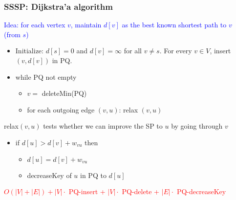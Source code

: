   \begin{frame}[fragile]
  \frametitle{SSSP: Dijkstra'a algorithm}

\textcolor{blue}{Idea: for each vertex $v$, maintain $d[v]$ as the best known shortest path to $v$ (from $s$)}

 
\begin{itemize} 
\item  Initialize: $d[s]=0$ and  $d[v] = \infty$ for all $v \neq s$. For every $v \in V$, insert $(v,d[v])$ in PQ. 

\item while PQ not empty 
  \begin{itemize}
  \item $v  = $ deleteMin(PQ) 
  \item for each outgoing edge $(v,u)$: relax $(v,u)$
  \end{itemize} 
\end{itemize} 


relax$(v,u)$ tests whether we can improve the SP to $u$ by going through $v$
\begin{itemize} 
\item if $d[u] > d[v]+w_{vu}$ then 
  \begin{itemize}
  \item $d[u] = d[v]+w_{vu}$ 
  \item decreaseKey of $u$ in PQ to $d[u]$
  \end{itemize} 
\end{itemize} 

\textcolor{red}{$O(|V|+|E|) + |V| \cdot$ PQ-insert + $|V| \cdot $ PQ-delete + $|E| \cdot $ PQ-decreaseKey}
\end{frame}



